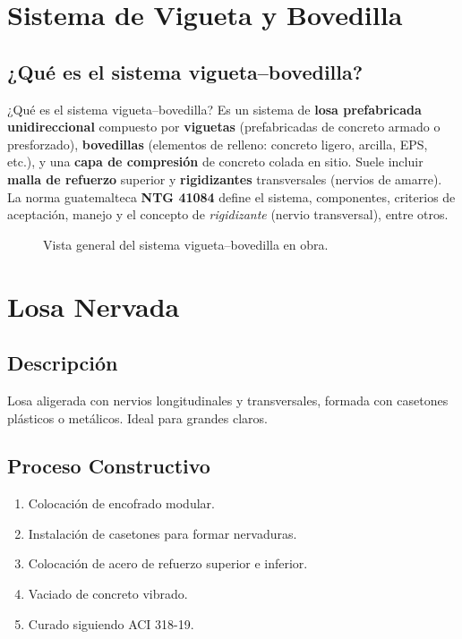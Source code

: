 \documentclass[12pt,a4paper]{article}
\begin{document}
	
	
	
\section{Sistema de Vigueta y Bovedilla}

\subsection{¿Qué es el sistema vigueta--bovedilla?}{¿Qué es el sistema vigueta--bovedilla?}
Es un sistema de \textbf{losa prefabricada unidireccional} compuesto por \textbf{viguetas} (prefabricadas de concreto armado o presforzado), \textbf{bovedillas} (elementos de relleno: concreto ligero, arcilla, EPS, etc.), y una \textbf{capa de compresión} de concreto colada en sitio. Suele incluir \textbf{malla de refuerzo} superior y \textbf{rigidizantes} transversales (nervios de amarre). La norma guatemalteca \textbf{NTG 41084} define el sistema, componentes, criterios de aceptación, manejo y el concepto de \textit{rigidizante} (nervio transversal), entre otros.

\begin{figure}[h]
	\centering
	\caption{Vista general del sistema vigueta--bovedilla en obra.}
	\label{fig:vigueta_bovedilla_esquema_real}
\end{figure}
	
	
	
	
	
	
	\section{Losa Nervada}
	\subsection{Descripción}
	Losa aligerada con nervios longitudinales y transversales, formada con casetones plásticos o metálicos. Ideal para grandes claros.
	
	\subsection{Proceso Constructivo}
	\begin{enumerate}
		\item Colocación de encofrado modular.
		\item Instalación de casetones para formar nervaduras.
		\item Colocación de acero de refuerzo superior e inferior.
		\item Vaciado de concreto vibrado.
		\item Curado siguiendo ACI 318-19.
	\end{enumerate}
	
\end{document}

